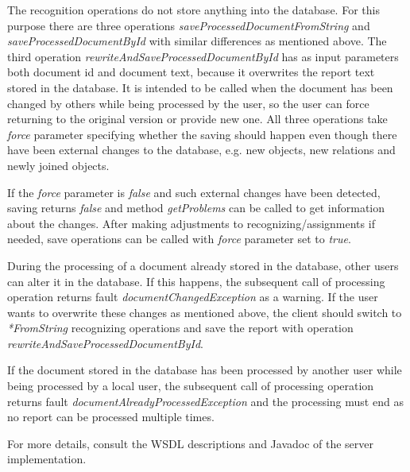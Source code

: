 The recognition operations do not store anything into the database. For this
purpose there are three operations \emph{saveProcessedDocumentFromString} and
\emph{saveProcessedDocumentById} with similar differences as mentioned above.
The third operation \emph{rewriteAndSaveProcessedDocumentById} has as input
parameters both document id and document text, because it overwrites the report
text stored in the database. It is intended to be called when the document has
been changed by others while being processed by the user, so the user can
force returning to the original version or provide new one. All three operations
take \emph{force} parameter specifying whether the saving should happen even
though there have been external changes to the database, e.g. new objects, new
relations and newly joined objects.

If the \emph{force} parameter is \emph{false} and such external changes have
been detected, saving returns \emph{false} and method \emph{getProblems} can be
called to get information about the changes. After making adjustments to
recognizing/assignments if needed, save operations can be called with
\emph{force} parameter set to \emph{true}.

During the processing of a document already stored in the database, other users
can alter it in the database. If this happens, the subsequent call of processing
operation returns fault \emph{documentChangedException} as a warning. If the
user wants to overwrite these changes as mentioned above, the client should
switch to \emph{*FromString} recognizing operations and save the report with
operation \emph{rewriteAndSaveProcessedDocumentById}.

If the document stored in the database has been processed by another user while
being processed by a local user, the subsequent call of processing operation
returns fault \emph{documentAlreadyProcessedException} and the processing must
end as no report can be processed multiple times.

For more details, consult the WSDL descriptions and Javadoc of the server
implementation.



